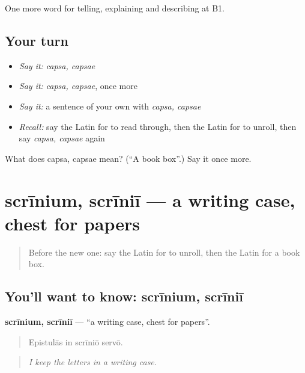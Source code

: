 \begin{grammarlens}[title={What you've built}]
One more word for telling, explaining and describing at B1.
\end{grammarlens}

\subsection*{Your turn}
\begin{itemize}
\raggedright
  \item \emph{Say it:} \emph{capsa, capsae}
  \item \emph{Say it:} \emph{capsa, capsae}, once more
  \item \emph{Say it:} a sentence of your own with \emph{capsa, capsae}
  \item \emph{Recall:} say the Latin for to read through, then the Latin for to unroll, then say \emph{capsa, capsae} again
\end{itemize}

\begin{tcolorbox}[breakable,colback=teal!4,colframe=teal!35!black,title={Before you move on}]
What does capsa, capsae mean? (\textquotedblleft{}A book box\textquotedblright{}.) Say it once more.
\end{tcolorbox}
\section[scrīnium, scrīniī]{scrīnium, scrīniī — a writing case, chest for papers}

\label{lesson:LA-C551-scrinium}



\begin{quote}
Before the new one: say the Latin for to unroll, then the Latin for a book box.
\end{quote}

\subsection*{You'll want to know: scrīnium, scrīniī}
\textbf{scrīnium, scrīniī} — \textquotedblleft{}a writing case, chest for papers\textquotedblright{}.

\begin{quote}
Epistulās in scrīniō servō.
\end{quote}

\begin{quote}
\emph{I keep the letters in a writing case.}
\end{quote}

